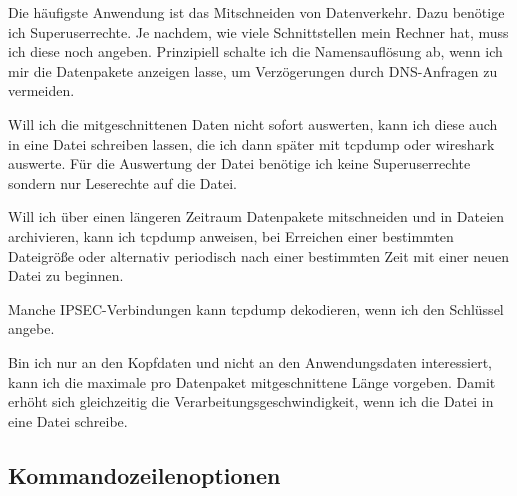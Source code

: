 \begin{normaltext}
  Die häufigste Anwendung ist das Mitschneiden von Datenverkehr. Dazu benötige
  ich Superuserrechte. Je nachdem, wie viele Schnittstellen mein Rechner hat,
  muss ich diese noch angeben. Prinzipiell schalte ich die Namensauflösung ab,
  wenn ich mir die Datenpakete anzeigen lasse, um Verzögerungen durch
  DNS-Anfragen zu vermeiden.

  Will ich die mitgeschnittenen Daten nicht sofort auswerten, kann ich diese
  auch in eine Datei schreiben lassen, die ich dann später mit tcpdump oder
  wireshark auswerte. Für die Auswertung der Datei benötige ich keine
  Superuserrechte sondern nur Leserechte auf die Datei.

  Will ich über einen längeren Zeitraum Datenpakete mitschneiden und in
  Dateien archivieren, kann ich tcpdump anweisen, bei Erreichen einer
  bestimmten Dateigröße oder alternativ periodisch nach einer bestimmten Zeit
  mit einer neuen Datei zu beginnen.

  Manche IPSEC-Verbindungen kann tcpdump dekodieren, wenn ich den Schlüssel
  angebe.

  Bin ich nur an den Kopfdaten und nicht an den Anwendungsdaten interessiert,
  kann ich die maximale pro Datenpaket mitgeschnittene Länge vorgeben. Damit
  erhöht sich gleichzeitig die Verarbeitungsgeschwindigkeit, wenn ich die
  Datei in eine Datei schreibe.

  \subsection{Kommandozeilenoptionen}


\end{normaltext}
